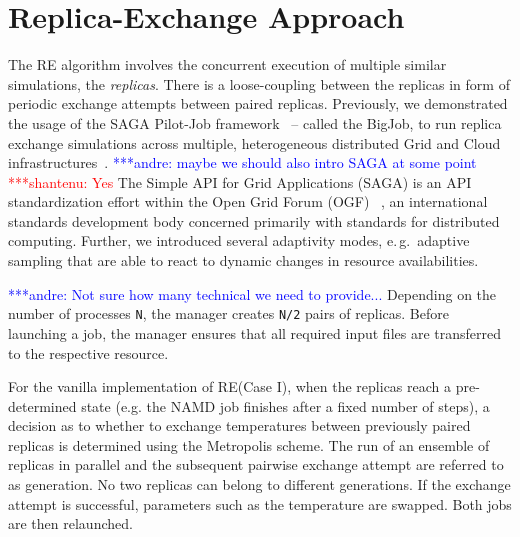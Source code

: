 \documentclass[a4paper,10pt]{article}
\newcommand{\jhanote}[1]{ {\textcolor{red} { ***shantenu: #1 }}}
\newcommand{\alnote}[1]{ {\textcolor{blue} { ***andre: #1 }}}
\newcommand{\athotanote}[1]{ {\textcolor{green} { ***athota: #1 }}}
\newcommand{\alnote}[1]{}
\newcommand{\jhanote}[1]{}
\newcommand{\athotanote}[1]{}
\begin{document}

\section{Replica-Exchange Approach}

The RE algorithm involves the concurrent execution of multiple similar
simulations, the \emph{replicas}.  There is a loose-coupling between
the replicas in form of periodic exchange attempts between paired
replicas. Previously, we demonstrated the usage of the SAGA Pilot-Job
framework~\cite{saga_bigjob_condor_cloud} -- called the BigJob, to run
replica exchange simulations across multiple, heterogeneous
distributed Grid and Cloud infrastructures~\cite{Luckow:2008fp}.
\alnote{maybe we should also intro SAGA at some point} \jhanote{Yes}
The Simple API for Grid Applications (SAGA) is an
API standardization effort within the Open Grid Forum
(OGF) ~\cite{}, an international standards development body
concerned primarily with standards for distributed computing.
Further, we introduced several adaptivity modes, e.\,g.\ adaptive
sampling that are able to react to dynamic changes in resource
availabilities.

\alnote{Not sure how many technical we need to provide...}  Depending
on the number of processes \texttt{N}, the manager creates \texttt{N/2} pairs
of replicas.  Before launching a job, the manager ensures that all
required input files are transferred to the respective resource. %

For the vanilla implementation of RE(Case I), when the replicas reach a
pre-determined state (e.g. the NAMD job finishes after a fixed number
of steps), a decision as to whether to exchange temperatures between
previously paired replicas is determined using the Metropolis scheme.
The run of an ensemble of replicas in parallel and the subsequent
pairwise exchange attempt are referred to as generation. No two
replicas can belong to different generations. If the exchange attempt
is successful, parameters such as the temperature are swapped. Both
jobs are then relaunched. %
 
\end{document}
